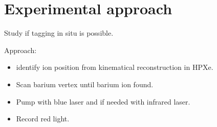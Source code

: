 \section{Experimental approach}

Study if tagging in situ is possible.

Approach: 

\begin{itemize}
\item identify ion position from kinematical reconstruction in HPXe.
\item Scan barium vertex until barium ion found.
\item Pump with blue laser and if needed with infrared laser.
\item Record red light.
\end{itemize}